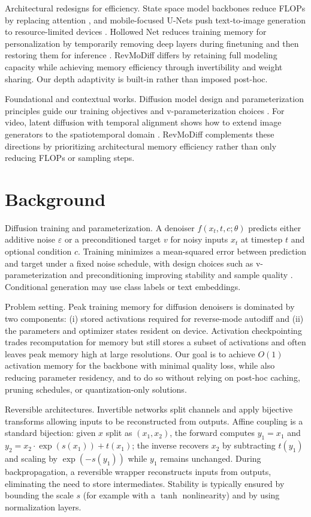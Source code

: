 \documentclass{article}
\begin{document}
Architectural redesigns for efficiency. State space model backbones reduce FLOPs by replacing attention \cite{yan-2023-diffusion}, and mobile-focused U-Nets push text-to-image generation to resource-limited devices \cite{li-2023-snapfusion}. Hollowed Net reduces training memory for personalization by temporarily removing deep layers during finetuning and then restoring them for inference \cite{cho-2024-hollowed}. RevMoDiff differs by retaining full modeling capacity while achieving memory efficiency through invertibility and weight sharing. Our depth adaptivity is built-in rather than imposed post-hoc.

Foundational and contextual works. Diffusion model design and parameterization principles guide our training objectives and v-parameterization choices \cite{dhariwal-2021-diffusion,karras-2022-elucidating}. For video, latent diffusion with temporal alignment shows how to extend image generators to the spatiotemporal domain \cite{blattmann-2023-align}. RevMoDiff complements these directions by prioritizing architectural memory efficiency rather than only reducing FLOPs or sampling steps.

\section{Background}
Diffusion training and parameterization. A denoiser $f(x_t, t, c; \theta)$ predicts either additive noise $\varepsilon$ or a preconditioned target $v$ for noisy inputs $x_t$ at timestep $t$ and optional condition $c$. Training minimizes a mean-squared error between prediction and target under a fixed noise schedule, with design choices such as v-parameterization and preconditioning improving stability and sample quality \cite{dhariwal-2021-diffusion,karras-2022-elucidating}. Conditional generation may use class labels or text embeddings.

Problem setting. Peak training memory for diffusion denoisers is dominated by two components: (i) stored activations required for reverse-mode autodiff and (ii) the parameters and optimizer states resident on device. Activation checkpointing trades recomputation for memory but still stores a subset of activations and often leaves peak memory high at large resolutions. Our goal is to achieve $O(1)$ activation memory for the backbone with minimal quality loss, while also reducing parameter residency, and to do so without relying on post-hoc caching, pruning schedules, or quantization-only solutions.

Reversible architectures. Invertible networks split channels and apply bijective transforms allowing inputs to be reconstructed from outputs. Affine coupling is a standard bijection: given $x$ split as $(x_1, x_2)$, the forward computes $y_1 = x_1$ and $y_2 = x_2 \cdot \exp(s(x_1)) + t(x_1)$; the inverse recovers $x_2$ by subtracting $t(y_1)$ and scaling by $\exp(-s(y_1))$ while $y_1$ remains unchanged. During backpropagation, a reversible wrapper reconstructs inputs from outputs, eliminating the need to store intermediates. Stability is typically ensured by bounding the scale $s$ (for example with a $\tanh$ nonlinearity) and by using normalization layers.
\end{document}
